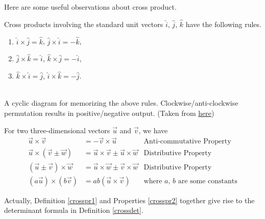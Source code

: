 Here are some useful observations about cross product.
\begin{defn}
\label{crosspr1}
Cross products involving the standard unit vectors $\hat{i}$, $\hat{j}$, $\hat{k}$ have the following rules.
\begin{enumerate}
\item $\hat{i} \times \hat{j} = \hat{k}$, $\hat{j} \times \hat{i} = -\hat{k}$,
\item $\hat{j} \times \hat{k} = \hat{i}$, $\hat{k} \times \hat{j} = -\hat{i}$,
\item $\hat{k} \times \hat{i} = \hat{j}$, $\hat{i} \times \hat{k} = -\hat{j}$.
\end{enumerate}
\end{defn}
\begin{center}
\\
A cyclic diagram for memorizing the above rules. Clockwise/anti-clockwise permutation results in positive/negative output. (Taken from \href{https://mathinsight.org/cross_product_formula}{here})
\end{center}
\begin{proper}
\label{crosspr2}
For two three-dimensional vectors $\vec{u}$ and $\vec{v}$, we have
\begin{align*}
\vec{u} \times \vec{v} &= -\vec{v} \times \vec{u} &\text{Anti-commutative Property} \\
\vec{u} \times (\vec{v} \pm \vec{w}) &= \vec{u} \times \vec{v} \pm \vec{u} \times \vec{w} &\text{Distributive Property} \\
(\vec{u} \pm \vec{v}) \times \vec{w} &= \vec{u} \times \vec{w} \pm \vec{v} \times \vec{w} &\text{Distributive Property} \\
(a\vec{u}) \times (b\vec{v}) &= ab(\vec{u} \times \vec{v}) &\text{where $a$, $b$ are some constants}
\end{align*}
\end{proper}
Actually, Definition \ref{crosspr1} and Properties \ref{crosspr2} together give rise to the determinant formula in Definition \ref{crossdet}. 

